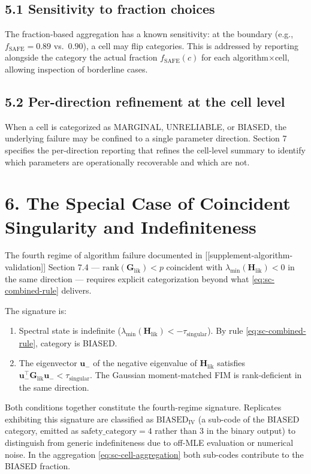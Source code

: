 \documentclass[11pt]{article}
\begin{document}
\subsection*{5.1 Sensitivity to fraction choices}

The fraction-based aggregation has a known sensitivity: at the
boundary (e.g., $f_{\mathrm{SAFE}} = 0.89$ vs.\ $0.90$), a cell may
flip categories. This is addressed by reporting alongside the
category the actual fraction $f_{\mathrm{SAFE}}(c)$ for each
algorithm$\times$cell, allowing inspection of borderline cases.

\subsection*{5.2 Per-direction refinement at the cell level}

When a cell is categorized as MARGINAL, UNRELIABLE, or BIASED, the
underlying failure may be confined to a single parameter direction.
Section 7 specifies the per-direction reporting that refines the
cell-level summary to identify which parameters are operationally
recoverable and which are not.

\section*{6. The Special Case of Coincident Singularity and Indefiniteness}
\label{sec:sc-coincident}

The fourth regime of algorithm failure documented in
[[supplement-algorithm-validation]] Section 7.4 ---
$\mathrm{rank}(\mathbf G_{\mathrm{lik}}) < p$ coincident with
$\lambda_{\min}(\mathbf H_{\mathrm{lik}}) < 0$ in the same direction
--- requires explicit categorization beyond what
\eqref{eq:sc-combined-rule} delivers.

The signature is:
\begin{enumerate}
\item Spectral state is indefinite ($\lambda_{\min}(\mathbf H_{\mathrm{lik}}) < -\tau_{\mathrm{singular}}$).
  By rule \eqref{eq:sc-combined-rule}, category is BIASED.
\item The eigenvector $\mathbf u_-$ of the negative eigenvalue of
  $\mathbf H_{\mathrm{lik}}$ satisfies
  $\mathbf u_-^\top \mathbf G_{\mathrm{lik}} \mathbf u_- < \tau_{\mathrm{singular}}$.
  The Gaussian moment-matched FIM is rank-deficient in the same direction.
\end{enumerate}

Both conditions together constitute the fourth-regime signature.
Replicates exhibiting this signature are classified as
$\mathrm{BIASED}_{\mathrm{IV}}$ (a sub-code of the BIASED category,
emitted as
$\mathrm{safety\_category} = 4$ rather than $3$ in the binary output)
to distinguish from generic indefiniteness due to off-MLE evaluation
or numerical noise. In the aggregation \eqref{eq:sc-cell-aggregation}
both sub-codes contribute to the BIASED fraction.
\end{document}
